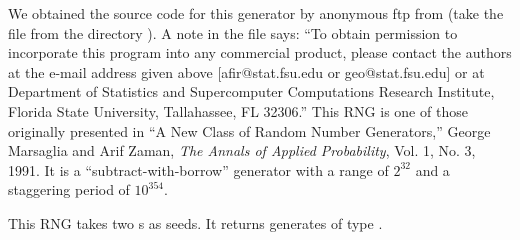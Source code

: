 \begin{description}
\begin{tex}
We obtained the source code for this generator by anonymous ftp from
 (take the file  from the directory
).  A note in the 
file says: ``To obtain permission to incorporate this program into any
commercial product, please contact the authors at the e-mail address
given above [afir@stat.fsu.edu or geo@stat.fsu.edu] or at Department of
Statistics and Supercomputer Computations Research Institute, Florida
State University, Tallahassee, FL 32306.''  This RNG is one of those
originally presented in ``A New Class of Random Number Generators,''
George Marsaglia and Arif Zaman, {\em The Annals of Applied
Probability}, Vol. 1, No. 3, 1991.  It is a ``subtract-with-borrow''
generator with a range of $2^{32}$ and a staggering period of
$10^{354}$.
\end{tex}

This RNG takes two s as seeds.  It returns generates
of type .
\end{description}


